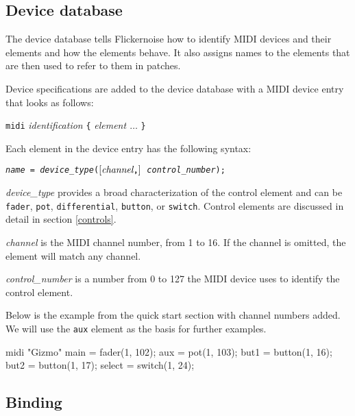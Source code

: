 \documentclass[11pt,a4paper]{article}
\newenvironment{expose}{\vskip3mm\qquad\begin{raggedright}}{%
\end{raggedright}\vskip3mm}
\begin{document}


\subsection{Device database}

The device database tells Flickernoise how to identify MIDI
devices and their elements and how the elements behave. It also
assigns names to the elements that are then used to refer to
them in patches.

Device specifications are added to the device database with 
a MIDI device entry that looks as follows:

\begin{expose}
{\tt midi} {\em identification} \verb"{" {\em element $\ldots$} \verb"}"
\end{expose}

Each element in the device entry has the following syntax:

\begin{expose}
{\tt {\em name} =
  {\em device\_type}($\left[\hbox{\em channel}\verb","\right]$
  {\em control\_number});}
\end{expose}

{\em device\_type} provides a broad characterization of the control
element and can be {\tt fader}, {\tt pot}, {\tt differential},
{\tt button}, or {\tt switch}. Control elements are discussed in
detail in section \ref{controls}.

{\em channel} is the MIDI channel number, from 1 to 16. If the channel
is omitted, the element will match any channel.

{\em control\_number} is a number from 0 to 127 the MIDI device uses
to identify the control element.

Below is the example from the quick start section with channel numbers
added. We will use the {\tt aux} element as the basis for further
examples.

\begin{listing}{1}
midi "Gizmo" {
	main = fader(1, 102);
	aux = pot(1, 103);
	but1 = button(1, 16);
	but2 = button(1, 17);
	select = switch(1, 24);
}
\end{listing}




\figbind

\subsection{Binding}
\label{binding}
\end{document}
